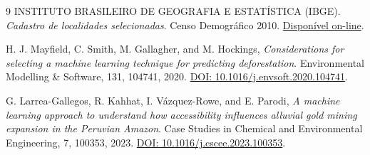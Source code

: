 \documentclass[a4paper,conference]{IEEEtran}
\begin{document}
\begin{thebibliography}{9}
 INSTITUTO BRASILEIRO DE GEOGRAFIA E ESTATÍSTICA (IBGE). \emph{Cadastro de localidades selecionadas}. Censo Demográfico 2010. \href{https://geoftp.ibge.gov.br/organizacao_do_territorio/estrutura_territorial/localidades/cadastro_de_localidades_selecionadas_2010/Shapefile_SHP/}{Disponível on-line}.

 H. J. Mayfield, C. Smith, M. Gallagher, and M. Hockings, \emph{Considerations for selecting a machine learning technique for predicting deforestation}. Environmental Modelling \& Software, 131, 104741, 2020. \href{https://doi.org/10.1016/j.envsoft.2020.104741}{DOI: 10.1016/j.envsoft.2020.104741}.

 G. Larrea-Gallegos, R. Kahhat, I. Vázquez-Rowe, and E. Parodi, \emph{A machine learning approach to understand how accessibility influences alluvial gold mining expansion in the Peruvian Amazon}. Case Studies in Chemical and Environmental Engineering, 7, 100353, 2023. \href{https://doi.org/10.1016/j.cscee.2023.100353}{DOI: 10.1016/j.cscee.2023.100353}.

\end{thebibliography}
\end{document}
